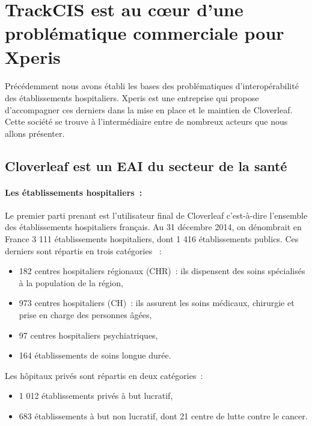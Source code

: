 	\section{TrackCIS est au cœur d'une problématique commerciale pour Xperis}
		\paragraph{}
		Précédemment nous avons établi les bases des problématiques d'interopérabilité
		des établissements hospitaliers. Xperis est une entreprise qui propose
		d'accompagner ces derniers dans la mise en place et le maintien de Cloverleaf.
		Cette société se trouve à l'intermédiaire entre de nombreux acteurs que nous
		allons présenter.
		
		\subsection{Cloverleaf est un EAI du secteur de la santé}
			\paragraph{Les établissements hospitaliers~:}%
			Le premier parti prenant est l'utilisateur final de
			Cloverleaf c'est-à-dire l'ensemble des établissements hospitaliers
			français.
			Au 31 décembre 2014, on dénombrait en France 3 111 établissements hospitaliers,
			dont 1 416 établissements publics. Ces derniers sont répartis en trois
			catégories \citep{drees_panoramas_2016}~:
			\begin{itemize}
				\item 182 centres hospitaliers régionaux (CHR)~: ils dispensent des soins 
				spécialisés à la population de la région,
				\item 973 centres hospitaliers (CH)~: ils assurent les soins médicaux, 
				chirurgie et prise en charge des personnes âgées,
				\item 97 centres hospitaliers psychiatriques,
				\item 164 établissements de soins longue durée.
			\end{itemize}
			Les hôpitaux privés sont répartis en deux catégories~:
			\begin{itemize}
				\item 1 012 établissements privés à but lucratif,
				\item 683 établissements à but non lucratif, dont 21 centre de lutte contre 
				le cancer.
			\end{itemize}
			
